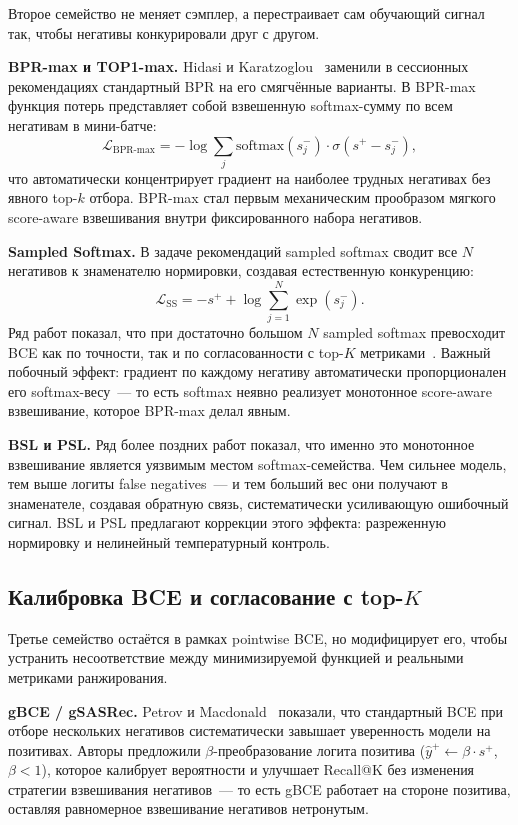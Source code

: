 Второе семейство не меняет сэмплер, а перестраивает сам обучающий сигнал так, чтобы негативы
конкурировали друг с другом.

\textbf{BPR-max и TOP1-max.} Hidasi и Karatzoglou~\cite{hidasi2018improved} заменили в сессионных
рекомендациях стандартный BPR на его смягчённые варианты. В BPR-max функция потерь представляет
собой взвешенную softmax-сумму по всем негативам в мини-батче:
\begin{equation}
    \mathcal{L}_{\text{BPR-max}} = -\log \sum_{j} \mathrm{softmax}(s_j^-) \cdot \sigma(s^+ - s_j^-),
\end{equation}
что автоматически концентрирует градиент на наиболее трудных негативах без явного top-$k$ отбора.
BPR-max стал первым механическим прообразом мягкого score-aware взвешивания внутри фиксированного
набора негативов.

\textbf{Sampled Softmax.} В задаче рекомендаций sampled softmax сводит все $N$ негативов к
знаменателю нормировки, создавая естественную конкуренцию:
\begin{equation}
    \mathcal{L}_{\text{SS}} = -s^+ + \log \sum_{j=1}^{N} \exp(s_j^-).
\end{equation}
Ряд работ показал, что при достаточно большом $N$ sampled softmax превосходит BCE как по
точности, так и по согласованности с top-$K$ метриками~\cite{xie2022cl4srec}. Важный побочный
эффект: градиент по каждому негативу автоматически пропорционален его softmax-весу~--- то есть
softmax неявно реализует монотонное score-aware взвешивание, которое BPR-max делал явным.

\textbf{BSL и PSL.} Ряд более поздних работ показал, что именно это монотонное взвешивание является
уязвимым местом softmax-семейства. Чем сильнее модель, тем выше логиты false negatives~--- и тем
больший вес они получают в знаменателе, создавая обратную связь, систематически усиливающую ошибочный
сигнал. BSL и PSL предлагают коррекции этого эффекта: разреженную нормировку и нелинейный
температурный контроль.

\subsection{Калибровка BCE и согласование с top-$K$}
\label{subsec:ch1:bce_calibration}

Третье семейство остаётся в рамках pointwise BCE, но модифицирует его, чтобы устранить
несоответствие между минимизируемой функцией и реальными метриками ранжирования.

\textbf{gBCE / gSASRec.} Petrov и Macdonald~\cite{petrov2023gsasrec} показали, что стандартный BCE
при отборе нескольких негативов систематически завышает уверенность модели на позитивах. Авторы
предложили $\beta$-преобразование логита позитива ($\hat{y}^+ \leftarrow \beta \cdot s^+$,
$\beta < 1$), которое калибрует вероятности и улучшает Recall@K без изменения стратегии
взвешивания негативов~--- то есть gBCE работает на стороне позитива, оставляя равномерное
взвешивание негативов нетронутым.

